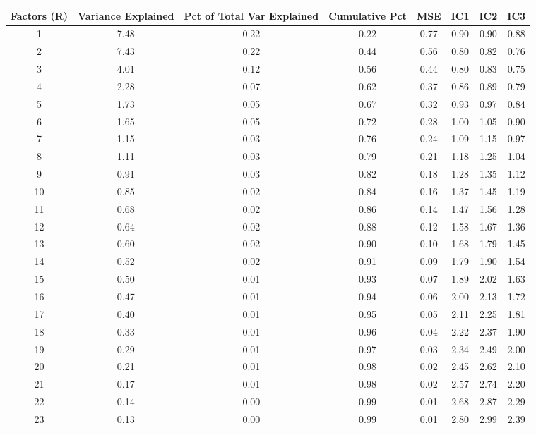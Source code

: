 \documentclass[11pt, letterpaper]{article}\usepackage[]{graphicx}\usepackage[]{color}
\begin{document}
\begin{table}[H]
\centering
\begingroup\scriptsize
\begin{tabular}{cccccccc}
  \hline
Factors (R) & Variance Explained & Pct of Total Var Explained & Cumulative Pct & MSE & IC1 & IC2 & IC3 \\ 
  \hline
  1 & 7.48 & 0.22 & 0.22 & 0.77 & 0.90 & 0.90 & 0.88 \\ 
    2 & 7.43 & 0.22 & 0.44 & 0.56 & 0.80 & 0.82 & 0.76 \\ 
    3 & 4.01 & 0.12 & 0.56 & 0.44 & 0.80 & 0.83 & 0.75 \\ 
    4 & 2.28 & 0.07 & 0.62 & 0.37 & 0.86 & 0.89 & 0.79 \\ 
    5 & 1.73 & 0.05 & 0.67 & 0.32 & 0.93 & 0.97 & 0.84 \\ 
    6 & 1.65 & 0.05 & 0.72 & 0.28 & 1.00 & 1.05 & 0.90 \\ 
    7 & 1.15 & 0.03 & 0.76 & 0.24 & 1.09 & 1.15 & 0.97 \\ 
    8 & 1.11 & 0.03 & 0.79 & 0.21 & 1.18 & 1.25 & 1.04 \\ 
    9 & 0.91 & 0.03 & 0.82 & 0.18 & 1.28 & 1.35 & 1.12 \\ 
   10 & 0.85 & 0.02 & 0.84 & 0.16 & 1.37 & 1.45 & 1.19 \\ 
   11 & 0.68 & 0.02 & 0.86 & 0.14 & 1.47 & 1.56 & 1.28 \\ 
   12 & 0.64 & 0.02 & 0.88 & 0.12 & 1.58 & 1.67 & 1.36 \\ 
   13 & 0.60 & 0.02 & 0.90 & 0.10 & 1.68 & 1.79 & 1.45 \\ 
   14 & 0.52 & 0.02 & 0.91 & 0.09 & 1.79 & 1.90 & 1.54 \\ 
   15 & 0.50 & 0.01 & 0.93 & 0.07 & 1.89 & 2.02 & 1.63 \\ 
   16 & 0.47 & 0.01 & 0.94 & 0.06 & 2.00 & 2.13 & 1.72 \\ 
   17 & 0.40 & 0.01 & 0.95 & 0.05 & 2.11 & 2.25 & 1.81 \\ 
   18 & 0.33 & 0.01 & 0.96 & 0.04 & 2.22 & 2.37 & 1.90 \\ 
   19 & 0.29 & 0.01 & 0.97 & 0.03 & 2.34 & 2.49 & 2.00 \\ 
   20 & 0.21 & 0.01 & 0.98 & 0.02 & 2.45 & 2.62 & 2.10 \\ 
   21 & 0.17 & 0.01 & 0.98 & 0.02 & 2.57 & 2.74 & 2.20 \\ 
   22 & 0.14 & 0.00 & 0.99 & 0.01 & 2.68 & 2.87 & 2.29 \\ 
   23 & 0.13 & 0.00 & 0.99 & 0.01 & 2.80 & 2.99 & 2.39 \\ 

\end{tabular}
\end{table}
\end{document}
